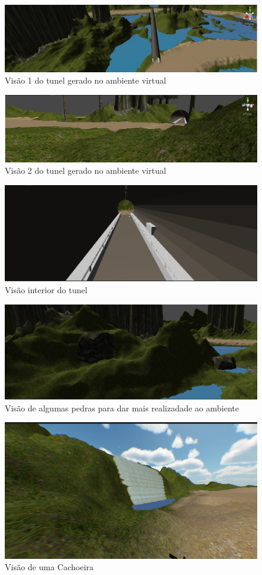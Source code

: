\begin{figure}[htpb]
 \begin{center}
    \includegraphics[width=.60\textwidth]{figuras/tunel1.png}
 \end{center}
  \caption{Visão 1 do tunel gerado no ambiente virtual}
  \label{fig:core_concurrent}
\end{figure}

\begin{figure}[htpb]
 \begin{center}
    \includegraphics[width=.60\textwidth]{figuras/tunel2.png}
 \end{center}
  \caption{Visão 2 do tunel gerado no ambiente virtual}
  \label{fig:core_concurrent}
\end{figure}

\begin{figure}[htpb]
 \begin{center}
    \includegraphics[width=.60\textwidth]{figuras/tunel3.png}
 \end{center}
  \caption{Visão interior do tunel}
  \label{fig:core_concurrent}
\end{figure}

\begin{figure}[htpb]
 \begin{center}
    \includegraphics[width=.60\textwidth]{figuras/rock.png}
 \end{center}
  \caption{Visão de algumas pedras para dar mais realizadade ao ambiente}
  \label{fig:core_concurrent}
\end{figure}

\begin{figure}[htpb]
 \begin{center}
    \includegraphics[width=.60\textwidth]{figuras/waterfall.png}
 \end{center}
  \caption{Visão de uma Cachoeira}
  \label{fig:core_concurrent}
\end{figure}

